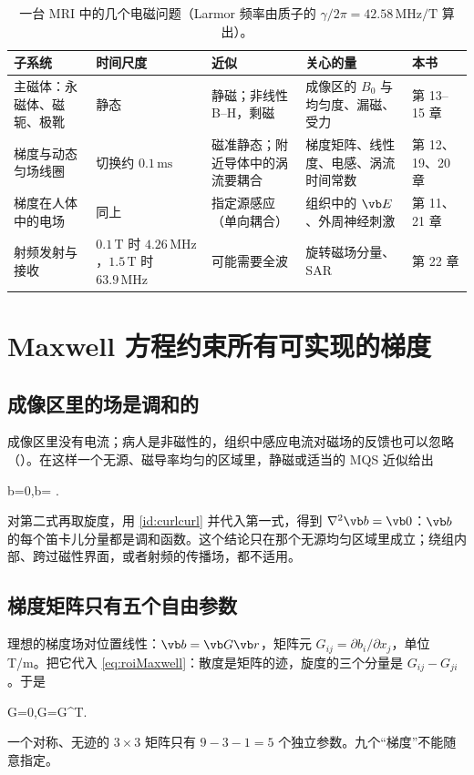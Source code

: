 \begin{table}[H]\centering\small
\caption{一台 MRI 中的几个电磁问题（Larmor 频率由质子的 $\gamma/2\pi=42.58\,\mathrm{MHz/T}$ 算出）。}\label{tab:mri-problems}
\begin{tabularx}{\linewidth}{@{}>{\raggedright\arraybackslash}p{.2\linewidth} >{\raggedright\arraybackslash}p{.17\linewidth} Y Y >{\raggedright\arraybackslash}p{.11\linewidth}@{}}
\toprule
子系统 & 时间尺度 & 近似 & 关心的量 & 本书\\\midrule
主磁体：永磁体、磁轭、极靴 & 静态 & 静磁；非线性 B--H，剩磁 & 成像区的 $B_0$ 与均匀度、漏磁、受力 & 第 13--15 章\\
梯度与动态匀场线圈 & 切换约 $0.1\,\mathrm{ms}$ & 磁准静态；附近导体中的涡流要耦合 & 梯度矩阵、线性度、电感、涡流时间常数 & 第 12、19、20 章\\
梯度在人体中的电场 & 同上 & 指定源感应（单向耦合） & 组织中的 $\vb E$、外周神经刺激 & 第 11、21 章\\
射频发射与接收 & $0.1\,\mathrm T$ 时 $4.26\,\mathrm{MHz}$，$1.5\,\mathrm T$ 时 $63.9\,\mathrm{MHz}$ & 可能需要全波 & 旋转磁场分量、SAR & 第 22 章\\
\bottomrule
\end{tabularx}
\end{table}

\section{Maxwell 方程约束所有可实现的梯度}\label{sec:mri-maxwell}

\subsection{成像区里的场是调和的}
成像区里没有电流；病人是非磁性的，组织中感应电流对磁场的反馈也可以忽略（）。在这样一个无源、磁导率均匀的区域里，静磁或适当的 MQS 近似给出
\begin{keyeq}
\nabla\cdot\vb b=0,\qquad \nabla\times\vb b= .
\label{eq:roiMaxwell}
\end{keyeq}
对第二式再取旋度，用 \eqref{id:curlcurl} 并代入第一式，得到 $\nabla^2\vb b=\vb 0$：$\vb b$ 的每个笛卡儿分量都是调和函数。这个结论只在那个无源均匀区域里成立；绕组内部、跨过磁性界面，或者射频的传播场，都不适用。

\subsection{梯度矩阵只有五个自由参数}
理想的梯度场对位置线性：$\vb b=\vb G\vb r$，矩阵元 $G_{ij}=\partial b_i/\partial x_j$，单位 T/m。把它代入 \eqref{eq:roiMaxwell}：散度是矩阵的迹，旋度的三个分量是 $G_{ij}-G_{ji}$。于是
\begin{keyeq}
\vb G=0,\qquad \vb G=\vb G^{\mathsf T}.
\label{eq:gradientmatrix}
\end{keyeq}
一个对称、无迹的 $3\times3$ 矩阵只有 $9-3-1=5$ 个独立参数。九个“梯度”不能随意指定。

